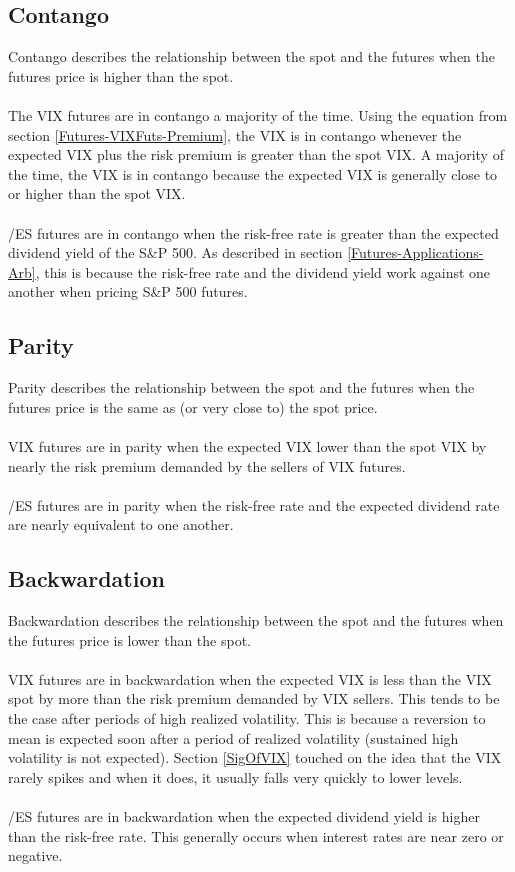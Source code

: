 \documentclass[11pt, oneside]{book}
\begin{document}
\subsection{Contango} \label{Futures-ConBackPar-Con}
Contango describes the relationship between the spot and the futures when the futures price is higher than the spot.\\
\\
The VIX futures are in contango a majority of the time. Using the equation from section \ref{Futures-VIXFuts-Premium}, the VIX is in contango whenever the expected VIX plus the risk premium is greater than the spot VIX. A majority of the time, the VIX is in contango because the expected VIX is generally close to or higher than the spot VIX.\\
\\
/ES futures are in contango when the risk-free rate is greater than the expected dividend yield of the S\&P 500. As described in section \ref{Futures-Applications-Arb}, this is because the risk-free rate and the dividend yield work against one another when pricing S\&P 500 futures.

\subsection{Parity} \label{Futures-ConBackPar-Par}
Parity describes the relationship between the spot and the futures when the futures price is the same as (or very close to) the spot price. \\
\\
VIX futures are in parity when the expected VIX lower than the spot VIX by nearly the risk premium demanded by the sellers of VIX futures.\\
\\
/ES futures are in parity when the risk-free rate and the expected dividend rate are nearly equivalent to one another.

\subsection{Backwardation} \label{Futures-ConBackPar-Back}
Backwardation describes the relationship between the spot and the futures when the futures price is lower than the spot.\\
\\
VIX futures are in backwardation when the expected VIX is less than the VIX spot by more than the risk premium demanded by VIX sellers. This tends to be the case after periods of high realized volatility. This is because a reversion to mean is expected soon after a period of realized volatility (sustained high volatility is not expected). Section \ref{SigOfVIX} touched on the idea that the VIX rarely spikes and when it does, it usually falls very quickly to lower levels.\\
\\
/ES futures are in backwardation when the expected dividend yield is higher than the risk-free rate. This generally occurs when interest rates are near zero or negative.
\end{document}
